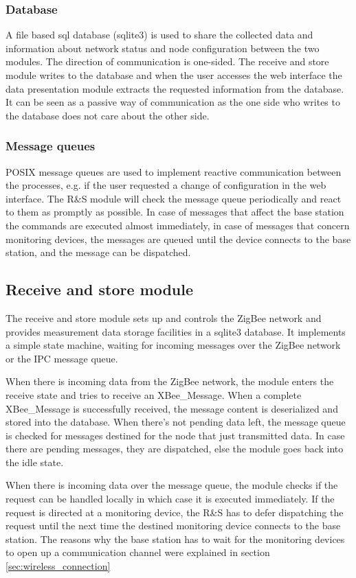 \subsubsection*{Database}
A file based sql database (sqlite3) is used to share the collected data and information about network status and node configuration between the two modules. The direction of communication is one-sided. The receive and store module writes to the database and when the user accesses the web interface the data presentation module extracts the requested information from the database. It can be seen as a passive way of communication as the one side who writes to the database does not care about the other side.


\subsubsection*{Message queues}
POSIX message queues are used to implement reactive communication between the processes, e.g. if the user requested a change of configuration in the web interface. The R\&S module will check the message queue periodically and react to them as promptly as possible. In case of messages that affect the base station the commands are executed almost immediately, in case of messages that concern monitoring devices, the messages are queued until the device connects to the base station, and the message can be dispatched.

\subsection{Receive and store module}
The receive and store module sets up and controls the  ZigBee network and provides measurement data storage facilities in a sqlite3 database. It implements a simple state machine, waiting for incoming messages over the ZigBee network or the IPC message queue.

When there is incoming data from the ZigBee network, the module enters the receive state and tries to receive an XBee\_Message. When a complete XBee\_Message is successfully received, the message content is deserialized and stored into the database. When there’s not pending data left, the message queue is checked for messages destined for the node that just transmitted data. In case there are pending messages, they are dispatched, else the module goes back into the idle state.

When there is incoming data over the message queue, the module checks if the request can be handled locally in which case it is executed immediately. If the request is directed at a monitoring device, the R\&S has to defer dispatching the request until the next time the destined monitoring device connects to the base station. The reasons why the base station has to wait for the monitoring devices to open up a communication channel were explained in section
\ref{sec:wireless_connection}

